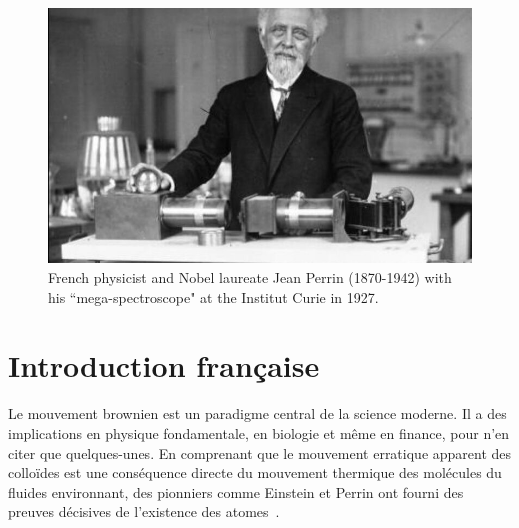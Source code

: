 \vspace{2cm}

\begin{figure}[h]
	\begin{center}
		\includegraphics[width=16cm]{02_body/introduction/image/perrin.jpg}
		\caption{French physicist and Nobel laureate Jean Perrin (1870-1942) with his ``mega-spectroscope" at the Institut Curie in 1927.}
	\end{center}
\end{figure}

\section{Introduction française}




Le mouvement brownien est un paradigme central de la science moderne. Il a des implications en physique fondamentale, en biologie et même en finance, pour n'en citer que quelques-unes. En comprenant que le mouvement erratique apparent des colloïdes est une conséquence directe du mouvement thermique des molécules du fluides environnant, des pionniers comme Einstein et Perrin ont fourni des preuves décisives de l'existence des atomes~\cite{einstein_uber_1905,perrin_les_2014}.

